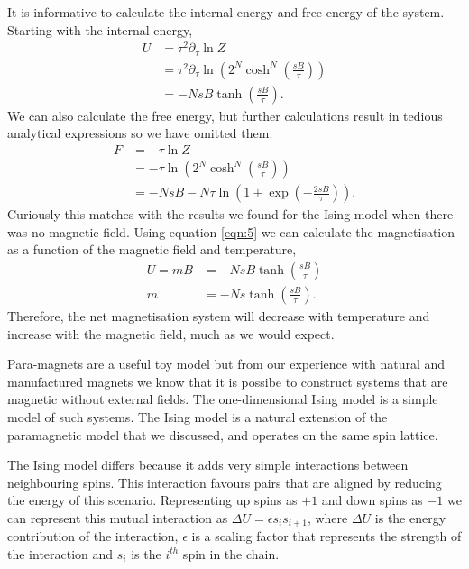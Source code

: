 \documentclass[a4paper, twocolumn]{article}
\begin{document}
It is informative to calculate the internal energy and free %
energy of the system. Starting with the internal energy,
%
\begin{align}
    U &= \tau^{2}\partial_{\tau}\ln Z\nonumber\\
        &= \tau^{2}\partial_{\tau}\ln\left(2^{N}\cosh^{N}
            \left(\frac{sB}{\tau}\right)\right)\nonumber\\
        &= -NsB\tanh\left(\frac{sB}{\tau}\right).
    \label{eqn:10}
\end{align}
%
We can also calculate the free energy, but further calculations %
result in tedious analytical expressions so we have omitted them. %
%
\begin{align}
    F &= -\tau\ln Z\nonumber\\
        &= -\tau\ln\left(2^{N}\cosh^{N}\left(\frac{sB}{\tau}
            \right)\right)\nonumber\\
        &= -NsB - N\tau\ln\left(1 + \exp\left(-\frac{2sB}{\tau}\right)
            \right).
    \label{eqn:11}
\end{align}
%
Curiously this matches with the results we found for the Ising %
model when there was no magnetic field. Using %
equation \ref{eqn:5} we can calculate the magnetisation as a function %
of the magnetic field and temperature, 
%
\begin{align}
    U = mB &= -NsB\tanh\left(\frac{sB}{\tau}\right)\nonumber\\
        m &= -Ns\tanh\left(\frac{sB}{\tau}\right).
    \label{eqn:12}
\end{align}
%
Therefore, the net magnetisation system will decrease with %
temperature and increase with the magnetic field, much as we %
would expect. 


Para-magnets are a useful toy model but from our experience %
with natural and manufactured magnets we know that it is %
possibe to construct systems that are magnetic without external %
fields. The one-dimensional Ising model is a simple model of %
such systems. The Ising model is a natural extension of the %
paramagnetic model that we discussed, and operates on the same %
spin lattice. 


The Ising model differs because it adds very simple interactions %
between neighbouring spins. This interaction favours pairs that %
are aligned by reducing the energy of this scenario. Representing %
up spins as \(+1\) and down spins as \(-1\) we can represent this %
mutual interaction as \(\Delta U = \epsilon s_{i}s_{i + 1}\), %
where \(\Delta U\) is the energy contribution of the %
interaction, \(\epsilon\) is a scaling factor that represents %
the strength of the interaction and \(s_{i}\) is the \(i^{th}\) %
spin in the chain. 
\end{document}
